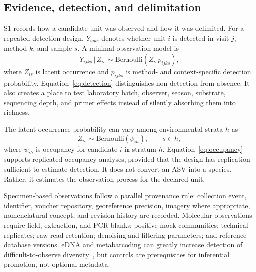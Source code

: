 \documentclass[conference]{IEEEtran}
\begin{document}
\subsection{Evidence, detection, and delimitation}

S1 records how a candidate unit was observed and how it was delimited. For a repeated detection design, $Y_{ijks}$ denotes whether unit $i$ is detected in visit $j$, method $k$, and sample $s$. A minimal observation model is
\begin{equation}
Y_{ijks}\,|\,Z_{is}\sim\mathrm{Bernoulli}\left(Z_{is}p_{ijks}\right),
\label{eq:detection}
\end{equation}
where $Z_{is}$ is latent occurrence and $p_{ijks}$ is method- and context-specific detection probability. Equation~\eqref{eq:detection} distinguishes non-detection from absence. It also creates a place to test laboratory batch, observer, season, substrate, sequencing depth, and primer effects instead of silently absorbing them into richness.

The latent occurrence probability can vary among environmental strata $h$ as
\begin{equation}
Z_{is}\sim\mathrm{Bernoulli}(\psi_{ih}), \qquad s\in h,
\label{eq:occupancy}
\end{equation}
where $\psi_{ih}$ is occupancy for candidate $i$ in stratum $h$. Equation~\eqref{eq:occupancy} supports replicated occupancy analyses, provided that the design has replication sufficient to estimate detection. It does not convert an ASV into a species. Rather, it estimates the observation process for the declared unit.

Specimen-based observations follow a parallel provenance rule: collection event, identifier, voucher repository, georeference precision, imagery where appropriate, nomenclatural concept, and revision history are recorded. Molecular observations require field, extraction, and PCR blanks; positive mock communities; technical replicates; raw read retention; denoising and filtering parameters; and reference-database versions. eDNA and metabarcoding can greatly increase detection of difficult-to-observe diversity~\cite{deiner2017,olds2016}, but controls are prerequisites for inferential promotion, not optional metadata.
\end{document}
